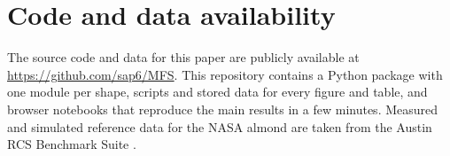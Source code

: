 \documentclass[preprint,12pt]{elsarticle}
\begin{document}

\section*{Code and data availability}
The source code and data for this paper are publicly available at \url{https://github.com/sap6/MFS}. This repository contains a Python package with one module per shape, scripts and stored data for every figure and table, and browser notebooks that reproduce the main results in a few minutes. Measured and simulated reference data for the NASA almond are taken from the Austin RCS Benchmark Suite \cite{kelley2020}.



\setlength{\bibsep}{2.5pt plus 0.5pt}


\end{document}
